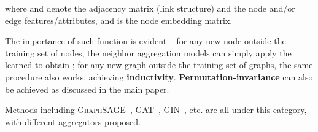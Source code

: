 \documentclass{article}
\newcommand{\gin}{\textsc{GIN}\xspace}
\begin{document}
\begin{itemize}
    where  and  denote the adjacency matrix (link structure) and the node and/or edge features/attributes, and  is the node embedding matrix. 
    
    The importance of such function  is evident -- for any new node  outside the training set of nodes, the neighbor aggregation models can simply apply the learned  to obtain ; for any new graph outside the training set of graphs, the same procedure also works, achieving \textbf{{inductivity}}. \textbf{{Permutation-invariance}} can also be achieved as discussed in the main paper.
    
    Methods including \textsc{GraphSAGE}~\cite{hamilton2017inductive}, \textsc{GAT}~\cite{velickovic2017graph}, \gin~\cite{xu2018powerful}, etc. are all under this category, with different aggregators proposed.
\end{itemize}
\end{document}
